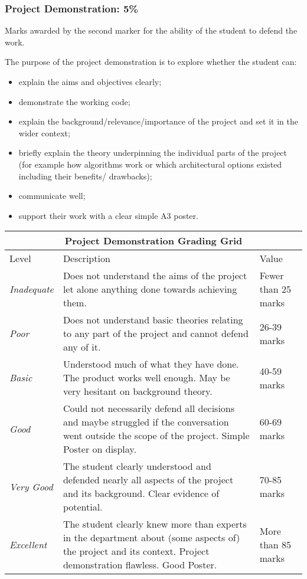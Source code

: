 \documentclass[11pt]{article}
\newcommand{\demoweight}{5\% }
\newcommand{\interimreportweight}{10\% }
\begin{document}
\newpage
\subsubsection{Project Demonstration: \demoweight}
\label{sec:assess-demo}
Marks awarded by the second marker for the ability of the student to defend the work.

The purpose of the project demonstration is to explore whether the student can:
\begin{itemize}
\item explain the aims and objectives clearly;
\item demonstrate the working code;
\item explain the background/relevance/importance of the project and set it in the wider context;
\item briefly explain the theory underpinning the individual parts of the project (for example how algorithms work or
which architectural options existed including their benefits/ drawbacks);
\item communicate well;
\item support their work with a clear simple A3 poster.
\end{itemize}

\vspace*{10mm}

\noindent
\begin{tabular}{||l|p{10cm}|l||}
\hline
\hline
\multicolumn{3}{||c||}{\textbf{Project Demonstration Grading Grid}}\\
\hline
\hline
Level & Description & Value\\
\hline
\textit{Inadequate} & Does not understand the aims of the project let alone anything done towards achieving them.
 & Fewer than 25 marks\\ \hline
\textit{Poor} & Does not understand basic theories relating to any part of the project and cannot defend any of it.
 & 26-39 marks\\ \hline
\textit{Basic} & Understood much of what they have done. The product works well enough. May be very hesitant on
background theory.
 & 40-59 marks\\ \hline
\textit{Good} &  Could not necessarily defend all
decisions and maybe struggled if the conversation went outside the scope of the project. Simple Poster on display.& 60-69 marks\\ \hline
\textit{Very Good} &  The student clearly understood and defended nearly all aspects of the project and its background.  Clear evidence of potential.
 & 70-85 marks\\ \hline
\textit{Excellent} &  The student clearly knew more than experts in the department about (some aspects of) the project
and its context.  Project demonstration flawless.  Good Poster.
 & More than 85 marks\\
\hline\hline
\end{tabular}
\end{document}
